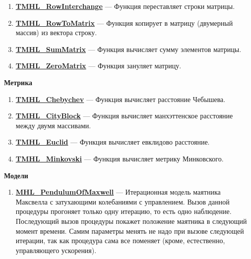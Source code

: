 \documentclass[a4paper,12pt]{article}
\begin{document}
\begin{enumerate}
\item \textbf{\hyperref[TMHL_RowInterchange]{TMHL\_RowInterchange}} --- Функция переставляет строки матрицы.

\item \textbf{\hyperref[TMHL_RowToMatrix]{TMHL\_RowToMatrix}} --- Функция копирует в матрицу (двумерный массив) из вектора строку.

\item \textbf{\hyperref[TMHL_SumMatrix]{TMHL\_SumMatrix}} --- Функция вычисляет сумму элементов матрицы.

\item \textbf{\hyperref[TMHL_ZeroMatrix]{TMHL\_ZeroMatrix}} --- Функция зануляет матрицу.

\end{enumerate}

\textbf{Метрика}
\begin{enumerate}

\item \textbf{\hyperref[TMHL_Chebychev]{TMHL\_Chebychev}} --- Функция вычисляет расстояние Чебышева.

\item \textbf{\hyperref[TMHL_CityBlock]{TMHL\_CityBlock}} --- Функция вычисляет манхэттенское расстояние между двумя массивами.

\item \textbf{\hyperref[TMHL_Euclid]{TMHL\_Euclid}} --- Функция вычисляет евклидово расстояние.

\item \textbf{\hyperref[TMHL_Minkovski]{TMHL\_Minkovski}} --- Функция вычисляет метрику Минковского.

\end{enumerate}

\textbf{Модели}
\begin{enumerate}

\item \textbf{\hyperref[MHL_PendulumOfMaxwell]{MHL\_PendulumOfMaxwell}} --- Итерационная модель маятника Максвелла с затухающими колебаниями с управлением. Вызов данной процедуры прогоняет только одну итерацию, то есть одно наблюдение. Последующий вызов процедуры покажет положение маятника в следующий момент времени. Самим параметры менять не надо при вызове следующей итерации, так как процедура сама все поменяет (кроме, естественно, управляющего ускорения).

\end{enumerate}
\end{document}

